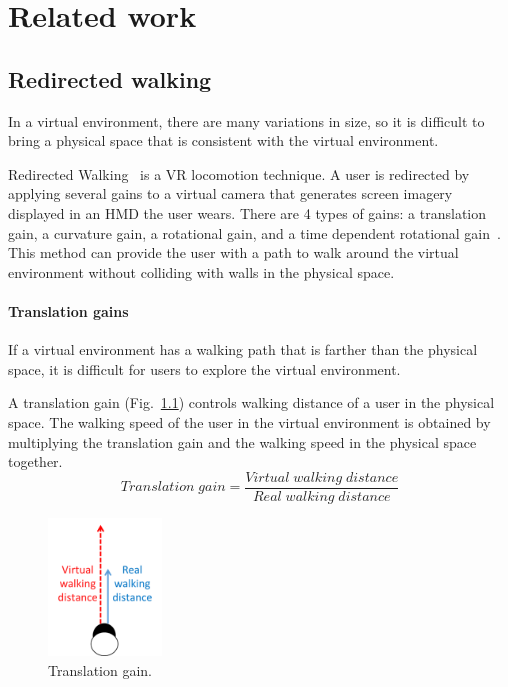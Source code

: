 \chapter{Related work} %

\label{Chapter2} %


\section{Redirected walking}%
In a virtual environment, there are many variations in size, so it is difficult to bring a physical space that is consistent with the virtual environment.



Redirected Walking~\cite{7892373} is a VR locomotion technique. A user is redirected by applying several gains to a virtual camera that generates screen imagery displayed in an HMD the user wears. There are 4 types of gains: a translation gain, a curvature gain, a rotational gain, and a time dependent rotational gain~\cite{10.2312:egs.20011036}\cite{10.1145/1450579.1450611}. This method can provide the user with a path to walk around the virtual environment without colliding with walls in the physical space.

\subsubsection{Translation gains}
If a virtual environment has a walking path that is farther than the physical space, it is difficult for users to explore the virtual environment. 

A translation gain (Fig.~\ref{fig:TGain}) controls walking distance of a user in the physical space. The walking speed of the user in the virtual environment is obtained by multiplying the translation gain and the walking speed in the physical space together. 
\[
Translation\;gain =\frac{ Virtual\;walking\;distance}{ Real\;walking\;distance}
 \]

\begin{figure}[H]\centering
	\includegraphics[width=0.27\textwidth]{Pictures/TranslationGain.png}%
	\caption{Translation gain.}\label{fig:TGain}%
\end{figure}


